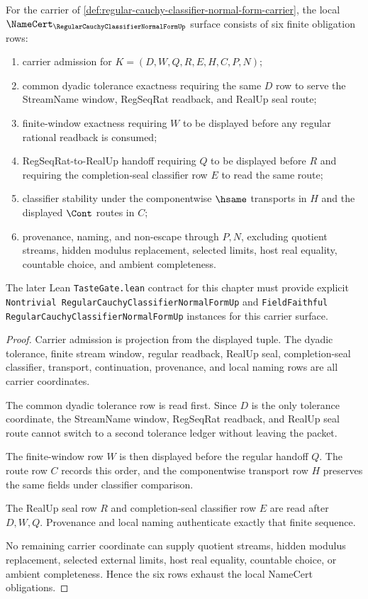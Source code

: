 \begin{theorem}
\label{thm:regular-cauchy-classifier-normal-form-obligations}
For the carrier of \autoref{def:regular-cauchy-classifier-normal-form-carrier}, the local $\NameCert_{\RegularCauchyClassifierNormalFormUp}$ surface consists of six finite obligation rows:
\begin{enumerate}
\item carrier admission for $K=(D,W,Q,R,E,H,C,P,N)$;
\item common dyadic tolerance exactness requiring the same $D$ row to serve the StreamName window, RegSeqRat readback, and RealUp seal route;
\item finite-window exactness requiring $W$ to be displayed before any regular rational readback is consumed;
\item RegSeqRat-to-RealUp handoff requiring $Q$ to be displayed before $R$ and requiring the completion-seal classifier row $E$ to read the same route;
\item classifier stability under the componentwise $\hsame$ transports in $H$ and the displayed $\Cont$ routes in $C$;
\item provenance, naming, and non-escape through $P,N$, excluding quotient streams, hidden modulus replacement, selected limits, host real equality, countable choice, and ambient completeness.
\end{enumerate}
The later Lean \texttt{TasteGate.lean} contract for this chapter must provide explicit \texttt{Nontrivial RegularCauchyClassifierNormalFormUp} and \texttt{FieldFaithful RegularCauchyClassifierNormalFormUp} instances for this carrier surface.
\end{theorem}
\begin{proof}
Carrier admission is projection from the displayed tuple. The dyadic tolerance, finite stream window, regular readback, RealUp seal, completion-seal classifier, transport, continuation, provenance, and local naming rows are all carrier coordinates.

The common dyadic tolerance row is read first. Since $D$ is the only tolerance coordinate, the StreamName window, RegSeqRat readback, and RealUp seal route cannot switch to a second tolerance ledger without leaving the packet.

The finite-window row $W$ is then displayed before the regular handoff $Q$. The route row $C$ records this order, and the componentwise transport row $H$ preserves the same fields under classifier comparison.

The RealUp seal row $R$ and completion-seal classifier row $E$ are read after $D,W,Q$. Provenance and local naming authenticate exactly that finite sequence.

No remaining carrier coordinate can supply quotient streams, hidden modulus replacement, selected external limits, host real equality, countable choice, or ambient completeness. Hence the six rows exhaust the local NameCert obligations.
\end{proof}


